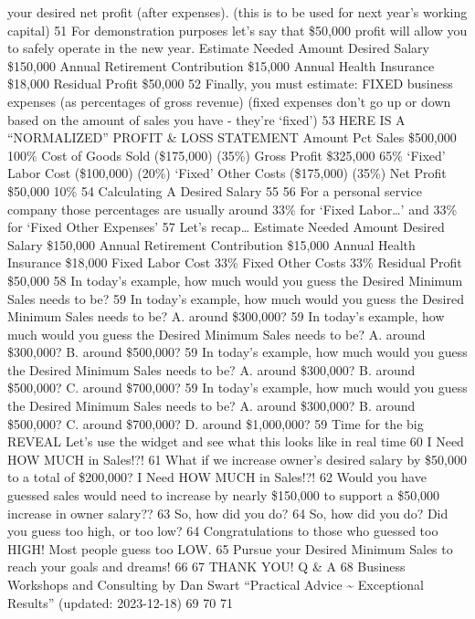 \documentclass[
]{book}
\begin{document}
your desired net profit (after expenses).
(this is to be used for next year's working capital) 51 For demonstration purposes let's say that \$50,000 profit will allow you to safely operate in the new year. Estimate Needed Amount Desired Salary \$150,000 Annual Retirement Contribution \$15,000 Annual Health Insurance \$18,000 Residual Profit \$50,000 52 Finally, you must estimate:
FIXED business expenses (as percentages of gross revenue) (fixed expenses don't go up or
down based on the amount of
sales you have - they're `fixed') 53 HERE IS A ``NORMALIZED'' PROFIT \& LOSS STATEMENT Amount Pct Sales \$500,000 100\% Cost of Goods Sold (\$175,000) (35\%) Gross Profit \$325,000 65\% `Fixed' Labor Cost (\$100,000) (20\%) `Fixed' Other Costs (\$175,000) (35\%) Net Profit \$50,000 10\% 54 Calculating A Desired Salary 55 56 For a personal service company those percentages are usually around 33\% for `Fixed Labor\ldots{}' and 33\% for `Fixed Other Expenses' 57 Let's recap\ldots{} Estimate Needed Amount Desired Salary \$150,000 Annual Retirement Contribution \$15,000 Annual Health Insurance \$18,000 Fixed Labor Cost 33\% Fixed Other Costs 33\% Residual Profit \$50,000 58 In today's example, how much would you guess the Desired Minimum Sales needs to be? 59 In today's example, how much would you guess the Desired Minimum Sales needs to be? A. around \$300,000? 59 In today's example, how much would you guess the Desired Minimum Sales needs to be? A. around \$300,000? B. around \$500,000? 59 In today's example, how much would you guess the Desired Minimum Sales needs to be? A. around \$300,000? B. around \$500,000? C. around \$700,000? 59 In today's example, how much would you guess the Desired Minimum Sales needs to be? A. around \$300,000? B. around \$500,000? C. around \$700,000? D. around \$1,000,000? 59 Time for the big REVEAL
Let's use the widget and see what this looks like in real time 60 I Need HOW MUCH in Sales!?! 61 What if we increase owner's desired salary by \$50,000 to a total of \$200,000? I Need HOW MUCH in Sales!?! 62 Would you have guessed sales would need to increase by nearly \$150,000 to support a \$50,000 increase in owner salary?? 63 So, how did you do? 64 So, how did you do? Did you guess too high, or too low? 64 Congratulations to those who guessed too HIGH! Most people guess too LOW. 65 Pursue your Desired Minimum Sales to reach your goals and dreams! 66 67 THANK YOU! Q
\&
A 68 Business Workshops and Consulting by Dan Swart ``Practical Advice \textasciitilde{} Exceptional Results'' (updated: 2023-12-18) 69 70 71
\end{document}
